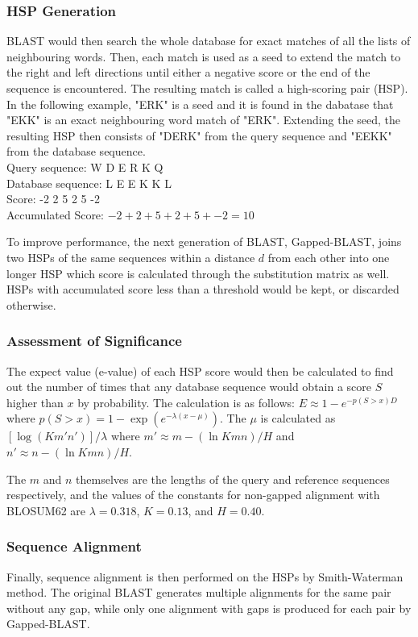\documentclass[titlepage]{csetr}
\begin{document}
\subsubsection{HSP Generation}
BLAST would then search the whole database for exact matches of all the lists of neighbouring words. Then, each match is used as a seed to extend the match to the right and left directions until either a negative score or the end of the sequence is encountered. The resulting match is called a high-scoring pair (HSP). In the following example, "ERK" is a seed and it is found in the dabatase that "EKK" is an exact neighbouring word match of "ERK". Extending the seed, the resulting HSP then consists of "DERK" from the query sequence and "EEKK" from the database sequence.\\
Query sequence:	W D E R K Q\\
Database sequence:	L E E K K L\\
Score:			-2 2 5 2 5 -2\\
Accumulated Score: $-2+2+5+2+5+-2=10$

To improve performance, the next generation of BLAST, Gapped-BLAST, joins two HSPs of the same sequences within a distance $d$ from each other into one longer HSP which score is calculated through the substitution matrix as well. HSPs with accumulated score less than a threshold would be kept, or discarded otherwise.

\subsubsection{Assessment of Significance}
The expect value (e-value) of each HSP score would then be calculated to find out the number of times that any database sequence would obtain a score $S$ higher than $x$ by probability. The calculation is as follows:
$E \approx 1-e^{-p(S > x) D}$ where $p(S>x) = 1- \exp (e^{-\lambda (x - \mu)})$. The $\mu$ is calculated as $[\log (Km'n')]/\lambda$ where $m' \approx m-(\ln Kmn)/H$ and $n' \approx n-(\ln Kmn)/H$.

The $m$ and $n$ themselves are the lengths of the query and reference sequences respectively, and the values of the constants for non-gapped alignment with BLOSUM62 are $\lambda=0.318$, $K=0.13$, and $H=0.40$.

\subsubsection{Sequence Alignment}
Finally, sequence alignment is then performed on the HSPs by Smith-Waterman method. The original BLAST generates multiple alignments for the same pair without any gap, while only one alignment with gaps is produced for each pair by Gapped-BLAST.
\end{document}
